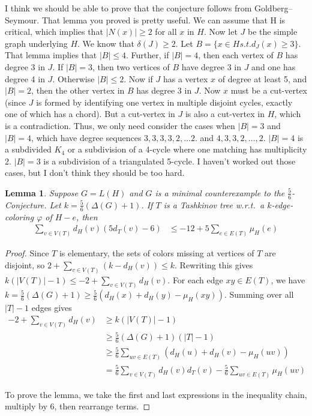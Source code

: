 \documentclass[12pt]{amsart}
\theoremstyle{plain}
\newtheorem{lem}[thm]{Lemma}
\theoremstyle{definition}
\theoremstyle{remark}
\newcommand{\vph}{\varphi}
\begin{document}
\bigskip
\bigskip

I think we should be able to prove that the conjecture follows from
Goldberg--Seymour.
That lemma you proved is pretty useful.  We can assume that H is
critical, which implies that $|N(x)| \ge 2$ for all $x$ in $H$.  Now let $J$
be the simple graph underlying $H$.  We know that $\delta(J) \ge 2$.  Let
$B = \{ x \in H s.t. d_J(x) \ge 3\}$.  That lemma implies that $|B| \le 4$.
Further, if $|B| = 4$, then each vertex of $B$ has degree 3 in $J$.  If
$|B|=3$, then two vertices of $B$ have degree 3 in $J$ and one has degree 4
in $J$.  Otherwise $|B| \le 2$.  Now if $J$ has a vertex $x$ of degree at
least 5, and $|B|=2$, then the other vertex in $B$ has degree 3 in $J$.  Now
$x$ must be a cut-vertex (since $J$ is formed by identifying one vertex in
multiple disjoint cycles, exactly one of which has a chord).  But a
cut-vertex in $J$ is also a cut-vertex in $H$, which is a contradiction.
Thus, we only need consider the cases when $|B|=3$ and $|B|=4$, which have
degree sequences $3,3,3,3,2,\ldots2$. and $4,3,3,2,\ldots,2$.
$|B|=4$ is a subdivided $K_4$ or a subdivision of a 4-cycle where one
matching has multiplicity 2.
$|B|=3$ is a subdivision of a triangulated 5-cycle.  I haven't worked
out those cases, but I don't think they should be too hard.
\newpage

\begin{lem}
\label{lem-A}
Suppose $G=L(H)$ and $G$ is a minimal counterexample to the
$\frac56$-Conjecture.  Let $k = \frac56(\Delta(G)+1)$.  If $T$ is a Tashkinov
tree w.r.t.~a $k$-edge-coloring $\vph$ of $H-e$, then
\begin{align*}
\sum_{v\in V(T)}d_H(v)(5d_T(v)-6) &\le -12 + 5\sum_{e\in E(T)}\mu_H(e)
\end{align*}
\end{lem}
\begin{proof}
Since $T$ is elementary, the sets of colors missing at vertices of $T$ are
disjoint, so $2+\sum_{v\in V(T)}(k-d_H(v))\le k$.  Rewriting this gives
$k(|V(T)|-1)\le -2 + \sum_{v\in V(T)}d_H(v)$.  
For each edge $xy\in E(T)$, we
have $k = \frac56(\Delta(G)+1)\ge \frac56(d_H(x)+d_H(y)-\mu_H(xy))$.
Summing over all $|T|-1$ edges gives
\begin{align*}
-2 + \sum_{v\in V(T)} d_H(v) &\ge k(|V(T)|-1) \\
&\ge \frac56(\Delta(G)+1)(|T|-1) \\
&\ge \frac56 \sum_{uv\in E(T)}(d_H(u)+d_H(v)-\mu_H(uv)) \\
& = \frac56\sum_{v\in V(T)}d_H(v)d_T(v)-\frac56\sum_{uv\in E(T)}\mu_H(uv)
\end{align*}

To prove the lemma, we take the first and last expressions in the inequality
chain, multiply by 6, then rearrange terms.
\end{proof}
\end{document}
